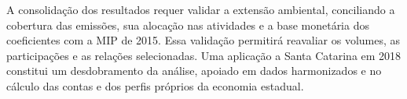 \documentclass[11pt]{article}
\begin{document}
A consolidação dos resultados requer validar a extensão ambiental, conciliando a cobertura das emissões, sua alocação nas atividades e a base monetária dos coeficientes com a MIP de 2015. Essa validação permitirá reavaliar os volumes, as participações e as relações selecionadas. Uma aplicação a Santa Catarina em 2018 constitui um desdobramento da análise, apoiado em dados harmonizados e no cálculo das contas e dos perfis próprios da economia estadual.

\clearpage
\begingroup
{}
\raggedright
\printbibliography[title={Referências}]
\endgroup

\end{document}
